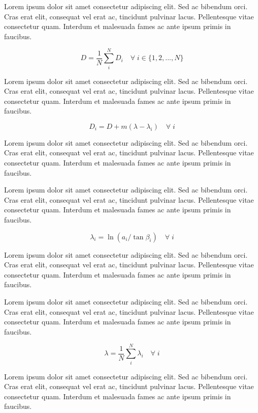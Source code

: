 \documentclass[./main.tex]{subfiles}
\begin{document}
\par Lorem ipsum dolor sit amet consectetur adipiscing elit. Sed ac bibendum orci. Cras erat elit, consequat vel erat ac, tincidunt pulvinar lacus. Pellentesque vitae consectetur quam. Interdum et malesuada fames ac ante ipsum primis in faucibus.
\begin{linenomath*}
\begin{equation}
\label{eq:topmodel:d1}
D = \frac{1}{N} \sum^{N}_{i} D_{i} \quad  \forall \; i \in \{ 1, 2, ..., N\}
\end{equation}
\end{linenomath*}
Lorem ipsum dolor sit amet consectetur adipiscing elit. Sed ac bibendum orci. Cras erat elit, consequat vel erat ac, tincidunt pulvinar lacus. Pellentesque vitae consectetur quam. Interdum et malesuada fames ac ante ipsum primis in faucibus.

\begin{linenomath*}
\begin{equation}
\label{eq:topmodel:d}
D_{i}  = D + m(\lambda - \lambda_{i}) \quad \forall \; i
\end{equation}
\end{linenomath*}
Lorem ipsum dolor sit amet consectetur adipiscing elit. Sed ac bibendum orci. Cras erat elit, consequat vel erat ac, tincidunt pulvinar lacus. Pellentesque vitae consectetur quam. Interdum et malesuada fames ac ante ipsum primis in faucibus.

\par Lorem ipsum dolor sit amet consectetur adipiscing elit. Sed ac bibendum orci. Cras erat elit, consequat vel erat ac, tincidunt pulvinar lacus. Pellentesque vitae consectetur quam. Interdum et malesuada fames ac ante ipsum primis in faucibus.
\begin{linenomath*}
\begin{equation}
\label{eq:topmodel:twi}
\lambda_{i}  = \ln{(a_{i}/\tan \beta_{i})} \quad \forall \; i
\end{equation}
\end{linenomath*}
Lorem ipsum dolor sit amet consectetur adipiscing elit. Sed ac bibendum orci. Cras erat elit, consequat vel erat ac, tincidunt pulvinar lacus. Pellentesque vitae consectetur quam. Interdum et malesuada fames ac ante ipsum primis in faucibus.

\par Lorem ipsum dolor sit amet consectetur adipiscing elit. Sed ac bibendum orci. Cras erat elit, consequat vel erat ac, tincidunt pulvinar lacus. Pellentesque vitae consectetur quam. Interdum et malesuada fames ac ante ipsum primis in faucibus.
\begin{linenomath*}
\begin{equation}
\label{eq:topmodel:twi}
\lambda  = \frac{1}{N} \sum^{N}_{i} \lambda_{i} \quad  \forall \; i
\end{equation}
\end{linenomath*}
Lorem ipsum dolor sit amet consectetur adipiscing elit. Sed ac bibendum orci. Cras erat elit, consequat vel erat ac, tincidunt pulvinar lacus. Pellentesque vitae consectetur quam. Interdum et malesuada fames ac ante ipsum primis in faucibus.
\end{document}

